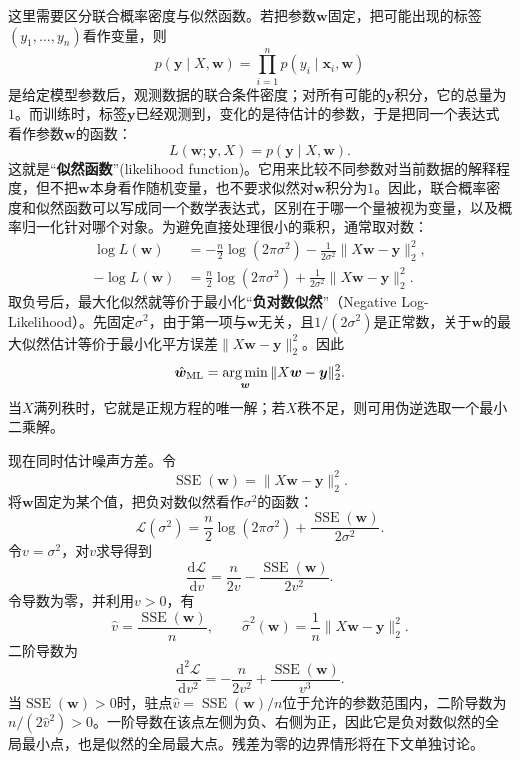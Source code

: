这里需要区分联合概率密度与似然函数。若把参数$\bm w$固定，把可能出现的标签$(y_1,\ldots,y_n)$看作变量，则
\begin{equation}
 p(\bm y\mid X,\bm w)
 =\prod_{i=1}^n p(y_i\mid\bm x_i,\bm w)
\end{equation}
是给定模型参数后，观测数据的联合条件密度；对所有可能的$\bm y$积分，它的总量为$1$。而训练时，标签$\bm y$已经观测到，变化的是待估计的参数，于是把同一个表达式看作参数$\bm w$的函数：
\begin{equation}
 L(\bm w;\bm y,X)=p(\bm y\mid X,\bm w).
\end{equation}
这就是“\textbf{似然函数}”(likelihood function)。它用来比较不同参数对当前数据的解释程度，但不把$\bm w$本身看作随机变量，也不要求似然对$\bm w$积分为$1$。因此，联合概率密度和似然函数可以写成同一个数学表达式，区别在于哪一个量被视为变量，以及概率归一化针对哪个对象。为避免直接处理很小的乘积，通常取对数：
\begin{align}
 \log L(\bm w)
 &=-\frac n2\log(2\pi\sigma^2)
 -\frac1{2\sigma^2}\|X\bm w-\bm y\|_2^2,\\
 -\log L(\bm w)
 &=\frac n2\log(2\pi\sigma^2)
 +\frac1{2\sigma^2}\|X\bm w-\bm y\|_2^2.
 \label{eq:linear-negative-log-likelihood}
\end{align}
取负号后，最大化似然就等价于最小化“\textbf{负对数似然}”（Negative Log-Likelihood）。先固定$\sigma^2$，由于第一项与$\bm w$无关，且$1/(2\sigma^2)$是正常数，关于$\bm w$的最大似然估计等价于最小化平方误差$\|X\bm w-\bm y\|_2^2$。因此
\begin{equation}
 \hat{\bm w}_{\mathrm{ML}}
 =\mathop{\mathrm{arg\,min}}_{\bm w}\|X\bm w-\bm y\|_2^2.
\end{equation}
当$X$满列秩时，它就是正规方程的唯一解；若$X$秩不足，则可用伪逆选取一个最小二乘解。

现在同时估计噪声方差。令
\begin{equation}
 \operatorname{SSE}(\bm w)=\|X\bm w-\bm y\|_2^2.
\end{equation}
将$\bm w$固定为某个值，把负对数似然看作$\sigma^2$的函数：
\begin{equation}
 \mathcal L(\sigma^2)
 =\frac n2\log(2\pi\sigma^2)
 +\frac{\operatorname{SSE}(\bm w)}{2\sigma^2}.
\end{equation}
令$v=\sigma^2$，对$v$求导得到
\begin{equation}
 \frac{\mathrm d\mathcal L}{\mathrm dv}
 =\frac{n}{2v}-\frac{\operatorname{SSE}(\bm w)}{2v^2}.
\end{equation}
令导数为零，并利用$v>0$，有
\begin{equation}
 \hat v=\frac{\operatorname{SSE}(\bm w)}{n},
 \qquad
 \hat\sigma^2(\bm w)=\frac1n\|X\bm w-\bm y\|_2^2.
\end{equation}
二阶导数为
\begin{equation}
 \frac{\mathrm d^2\mathcal L}{\mathrm dv^2}
 =-\frac{n}{2v^2}+\frac{\operatorname{SSE}(\bm w)}{v^3}.
\end{equation}
当$\operatorname{SSE}(\bm w)>0$时，驻点$\hat v=\operatorname{SSE}(\bm w)/n$位于允许的参数范围内，二阶导数为$n/(2\hat v^2)>0$。一阶导数在该点左侧为负、右侧为正，因此它是负对数似然的全局最小点，也是似然的全局最大点。残差为零的边界情形将在下文单独讨论。


